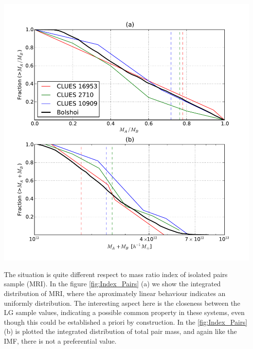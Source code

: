 \documentclass[usenatbib]{mn2e}
\begin{document}
\begin{flushleft}
\begin{center}
\includegraphics[keepaspectratio=true,width=0.35\textheight]{./figures/Pairs_IPMF.pdf}
\label{fig:Index_Pairs}
\vspace{0.1 cm}
\end{center}
\end{flushleft}

The situation is quite different respect to mass ratio index of isolated pairs sample (MRI). In the figure 
\ref{fig:Index_Pairs} (a) we show the integrated distribution of MRI, where the aproximately linear
behaviour indicates an uniformly distribution. The interesting aspect here is the closeness between 
the LG sample values, indicating a possible common property in these systems, even though this could be 
established a priori by construction.
In the \ref{fig:Index_Pairs} (b) is plotted the integrated distribution of total pair mass, and again like 
the IMF, there is not a preferential value.

\
\end{document}
